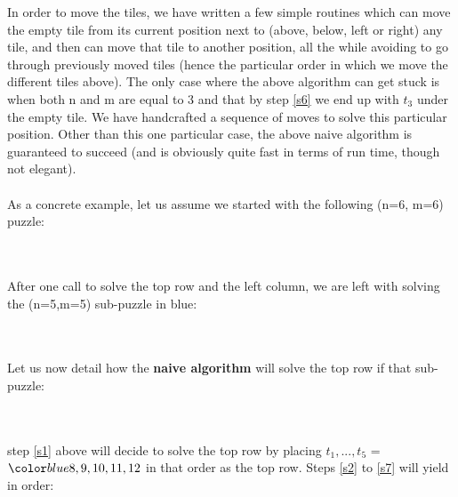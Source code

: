 In order to move the tiles, we have written a few simple routines which can move the empty tile from its current position next to (above, below, left or right) any tile, and then can move that tile to another position, all the while avoiding to go through previously moved tiles (hence the particular order in which we move the different tiles above). The only case where the above algorithm can get stuck is when both n and m are equal to 3 and that by step \ref{s6} we end up with $t_{3}$ under the empty tile. We have handcrafted a sequence of moves to solve this particular position. Other than this one particular case, the above naive algorithm is guaranteed to succeed (and is obviously quite fast in terms of run time, though not elegant).
\\
\\
As a concrete example, let us assume we started with the following (n=6, m=6) puzzle:
\\
\begin{thityfive}
\end{thityfive}
\\
\\
After one call to solve the top row and the left column, we are left with solving the (n=5,m=5) sub-puzzle in blue:
\\
\begin{thityfive}
\end{thityfive}
\\
\\
Let us now detail how the \textbf{naive algorithm} will solve the top row if that sub-puzzle:
\\
\begin{twentyfour}
\end{twentyfour}
\\
\\
step \ref{s1} above will decide to solve the top row by placing $t_{1}, ..., t_{5}$ = $\blue 8, 9, 10, 11, 12$ in that order as the top row. Steps \ref{s2} to \ref{s7} will yield in order:
